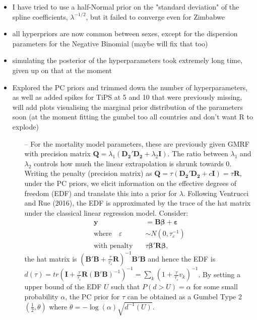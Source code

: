 \documentclass[12pt,a4paper]{article}
\date{\vspace{-5ex}}
\begin{document}
\begin{itemize}
\item I have tried to use a half-Normal prior on the "standard deviation" of the spline coefficients, $\lambda^{-1/2}$, but it failed to converge even for Zimbabwe

\item all hyperpriors are now common between sexes, except for the dispersion parameters for the Negative Binomial (maybe will fix that too)

\item simulating the posterior of the hyperparameters took extremely long time, given up on that at the moment

\item Explored the PC priors and trimmed down the number of hyperparameters, as well as added spikes for TiPS at 5 and 10 that were previously missing, will add plots visualising the marginal prior distribution of the parameters soon (at the moment fitting the gumbel too all countries and don't want R to explode)
	\begin{itemize}
	\item[--]  For the mortality model parameters, these are previously given GMRF with precision matrix $\boldsymbol{Q} = \lambda_1 (\boldsymbol{{D_2}'{D_2}} + \lambda_2 \boldsymbol{I})$. The ratio between $\lambda_1$ and $\lambda_2$ controls how much the linear extrapolation is shrunk towards 0. Writing the penalty (precision matrix) as $\boldsymbol{Q} = \tau (\boldsymbol{{D_2}'{D_2}} + c \boldsymbol{I}) = \tau \boldsymbol{R}$, under the PC priors, we elicit information on the effective degrees of freedom (EDF) and translate this into a prior for $\lambda$. Following Ventrucci and Rue (2016), the EDF is approximated by the trace of the hat matrix under the classical linear regression model. Consider:
	\begin{align*}
	 \boldsymbol{y} &= \boldsymbol{B \beta} + \boldsymbol{\varepsilon} \\
	\text{where} \quad \varepsilon &\sim N(0, \tau_{\varepsilon}^{-1}) \\
	\text{with penalty} \quad   &\tau \boldsymbol{\beta'R\beta},
	\end{align*}
the hat matrix is $(\boldsymbol{B'B} + \frac{\tau}{\tau_{\varepsilon}}\boldsymbol{R})^{-1}\boldsymbol{B'B}$ and hence the EDF is $d(\tau) = tr(\boldsymbol{I} + \frac{\tau}{\tau_{\varepsilon}}\boldsymbol{R(B'B)}^{-1})^{-1} = \sum_k (1 + \frac{\tau}{\tau_{\varepsilon}} v_k) ^{-1}$. By setting a upper bound of the EDF $U$ such that $P(d > U) = \alpha$ for some small probability $\alpha$, the PC prior for $\tau$ can be obtained as a Gumbel Type 2 $(\frac{1}{2}, \theta)$ where $\theta = -\log(\alpha) \sqrt{d^{-1}(U)}$.


\end{itemize}
\end{itemize}
\end{document}
